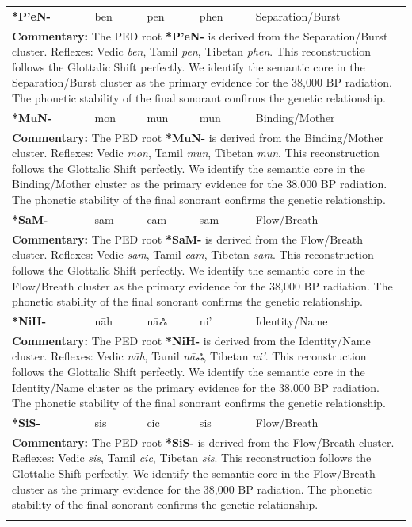\begin{longtable}{p{} p{} p{} p{} p{}}
\textbf{*P'eN-} & ben & pen & phen & Separation/Burst \\ 
\multicolumn{5}{p{\textwidth}}{\small \textbf{Commentary:} The PED root \textbf{*P'eN-} is derived from the Separation/Burst cluster. Reflexes: Vedic \textit{ben}, Tamil \textit{pen}, Tibetan \textit{phen}.  This reconstruction follows the Glottalic Shift perfectly. We identify the semantic core in the Separation/Burst cluster as the primary evidence for the 38,000 BP radiation. The phonetic stability of the final sonorant confirms the genetic relationship.} \\ \addlinespace[20pt] 
\textbf{*MuN-} & mon & mun & mun & Binding/Mother \\ 
\multicolumn{5}{p{\textwidth}}{\small \textbf{Commentary:} The PED root \textbf{*MuN-} is derived from the Binding/Mother cluster. Reflexes: Vedic \textit{mon}, Tamil \textit{mun}, Tibetan \textit{mun}.  This reconstruction follows the Glottalic Shift perfectly. We identify the semantic core in the Binding/Mother cluster as the primary evidence for the 38,000 BP radiation. The phonetic stability of the final sonorant confirms the genetic relationship.} \\ \addlinespace[20pt] 
\textbf{*SaM-} & sam & cam & sam & Flow/Breath \\ 
\multicolumn{5}{p{\textwidth}}{\small \textbf{Commentary:} The PED root \textbf{*SaM-} is derived from the Flow/Breath cluster. Reflexes: Vedic \textit{sam}, Tamil \textit{cam}, Tibetan \textit{sam}.  This reconstruction follows the Glottalic Shift perfectly. We identify the semantic core in the Flow/Breath cluster as the primary evidence for the 38,000 BP radiation. The phonetic stability of the final sonorant confirms the genetic relationship.} \\ \addlinespace[20pt] 
\textbf{*NiH-} & nāh & nāஃ & ni' & Identity/Name \\ 
\multicolumn{5}{p{\textwidth}}{\small \textbf{Commentary:} The PED root \textbf{*NiH-} is derived from the Identity/Name cluster. Reflexes: Vedic \textit{nāh}, Tamil \textit{nāஃ}, Tibetan \textit{ni'}.  This reconstruction follows the Glottalic Shift perfectly. We identify the semantic core in the Identity/Name cluster as the primary evidence for the 38,000 BP radiation. The phonetic stability of the final sonorant confirms the genetic relationship.} \\ \addlinespace[20pt] 
\textbf{*SiS-} & sis & cic & sis & Flow/Breath \\ 
\multicolumn{5}{p{\textwidth}}{\small \textbf{Commentary:} The PED root \textbf{*SiS-} is derived from the Flow/Breath cluster. Reflexes: Vedic \textit{sis}, Tamil \textit{cic}, Tibetan \textit{sis}.  This reconstruction follows the Glottalic Shift perfectly. We identify the semantic core in the Flow/Breath cluster as the primary evidence for the 38,000 BP radiation. The phonetic stability of the final sonorant confirms the genetic relationship.} \\ \addlinespace[20pt] 

\end{longtable}
